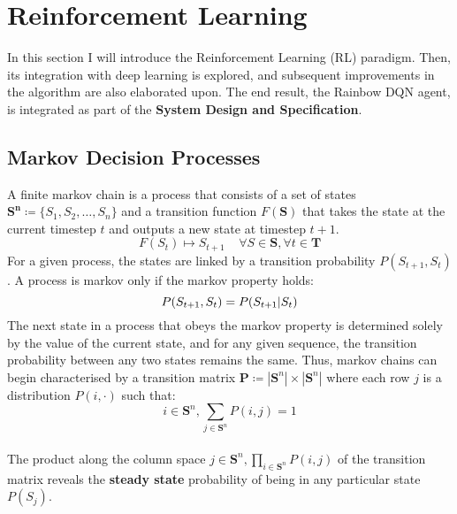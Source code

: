 \section{Reinforcement Learning}
In this section I will introduce the Reinforcement Learning (RL)
paradigm. Then, its integration with deep learning is explored, and
subsequent improvements in the algorithm are also elaborated upon.
The end result, the Rainbow DQN agent, is integrated as part of the \textbf{System Design and Specification}.
\subsection{Markov Decision Processes}
A finite markov chain is a process that consists of a set of states
$\mathbf{S^n} \coloneqq \{S_1, S_2, \hdots, S_n\}$ and a transition
function $F(\mathbf{S})$ that takes the state at the current
timestep $t$ and outputs a new state at timestep $t+1$.
\begin{equation}
    F(S_t) \mapsto S_{t+1} \;\;\;\; \forall S \in \mathbf{S}, \forall t\in \mathbf{T}
\end{equation}
For a given process, the states are linked by a transition probability
$P(S_{t+1}, S_t)$. A process is markov only if the markov property holds:
\begin{equation}
    P(S_{t+1}, S_t) = P(S_{t+1} | S_t) \\
\end{equation}
The next state in a process that obeys the markov property is determined
solely by the value of the current state, and for any given sequence, the transition
probability between any two states remains the same. Thus, markov chains can begin
characterised by a transition matrix $\mathbf{P} \coloneqq |\mathbf{S}^n| \times |\mathbf{S}^n|$
where each row $j$ is a distribution $P(i, \cdot)$ such that:
\begin{equation}
    i \in \mathbf{S}^n, \sum_{j \in \mathbf{S}^n} P(i,j) = 1
\end{equation}\\
The product along the column space $j \in \mathbf{S}^n,{\displaystyle \prod_{i \in \mathbf{S}^n}} P(i,j)$ of the transition matrix reveals
the \textbf{steady state} probability of being in any particular state $P(S_j)$.
